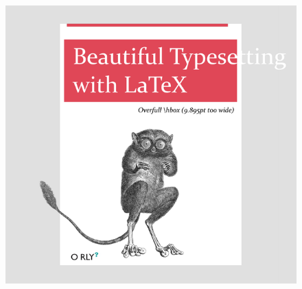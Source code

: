 \documentclass[compress]{beamer}
\begin{document}
\begin{frame}[Basic2]
\begin{columns}
\begin{column}{0.5\textwidth}
                \begin{figure}
                    \centering
                    \includegraphics[width=0.9\linewidth]{../figures/latex_typesetting}
                    \caption{}
                    \label{fig:latextypesetting}
                \end{figure}
            \end{column}
        \end{columns}
    \end{frame}
\end{document}
